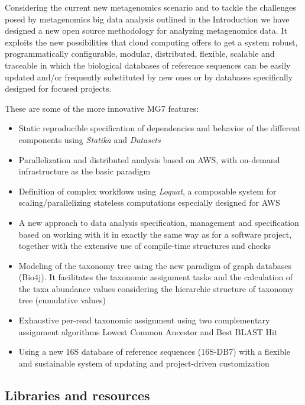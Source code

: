 \documentclass[fleqn,10pt,lineno]{wlpeerj}
\providecommand{\tightlist}{%
\setlength{\itemsep}{0pt}\setlength{\parskip}{0pt}}
\begin{document}
Considering the current new metagenomics scenario and to tackle the
challenges posed by metagenomics big data analysis outlined in the
Introduction we have designed a new open source methodology for
analyzing metagenomics data. It exploits the new possibilities that
cloud computing offers to get a system robust, programmatically
configurable, modular, distributed, flexible, scalable and traceable in
which the biological databases of reference sequences can be easily
updated and/or frequently substituted by new ones or by databases
specifically designed for focused projects.

These are some of the more innovative MG7 features:

\begin{itemize}
\tightlist
\item
  Static reproducible specification of dependencies and behavior of the
  different components using \emph{Statika} and \emph{Datasets}
\item
  Parallelization and distributed analysis based on AWS, with on-demand
  infrastructure as the basic paradigm
\item
  Definition of complex workflows using \emph{Loquat}, a composable
  system for scaling/parallelizing stateless computations especially
  designed for AWS
\item
  A new approach to data analysis specification, management and
  specification based on working with it in exactly the same way as for
  a software project, together with the extensive use of compile-time
  structures and checks
\item
  Modeling of the taxonomy tree using the new paradigm of graph
  databases (Bio4j). It facilitates the taxonomic assignment tasks and
  the calculation of the taxa abundance values considering the
  hierarchic structure of taxonomy tree (cumulative values)
\item
  Exhaustive per-read taxonomic assignment using two complementary
  assignment algorithms Lowest Common Ancestor and Best BLAST Hit
\item
  Using a new 16S database of reference sequences (16S-DB7) with a
  flexible and sustainable system of updating and project-driven
  customization
\end{itemize}

\subsection{Libraries and resources}\label{libraries-and-resources}
\end{document}
